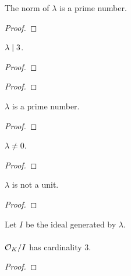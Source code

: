 \begin{lemma}
    \label{lmm:norm_lambda_prime}
    \leanok
    The norm of $\lambda$ is a prime number.
\end{lemma}
\begin{proof}
    \leanok
\end{proof}

\begin{lemma}
    \label{lmm:lambda_dvd_three}
    \leanok
    $\lambda \mid 3$.
\end{lemma}
\begin{proof}
    \leanok
\end{proof}

\begin{lemma}
    \label{lmm:zeta_sub_one_prime1}
    \leanok
\end{lemma}
\begin{proof}
    \leanok
\end{proof}

\begin{lemma}
    \label{lmm:lambda_prime}
    \leanok
    $\lambda$ is a prime number.
\end{lemma}
\begin{proof}
    \leanok
\end{proof}

\begin{lemma}
    \label{lmm:lambda_ne_zero}
    \leanok
    $\lambda \neq 0$.
\end{lemma}
\begin{proof}
    \leanok
\end{proof}

\begin{lemma}
    \label{lmm:lambda_not_unit}
    \leanok
    $\lambda$ is not a unit.
\end{lemma}
\begin{proof}
    \leanok
\end{proof}

\begin{lemma}
    \label{lmm:card_quot}
    \leanok
    Let $I$ be the ideal generated by $\lambda$. \\\\
    $\mathcal{O}_K / I$ has cardinality $3$.
\end{lemma}
\begin{proof}
    \leanok
\end{proof}

